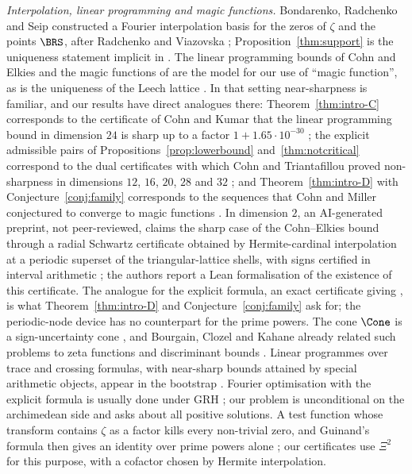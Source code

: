 \emph{Interpolation, linear programming and magic functions.} Bondarenko, Radchenko and Seip \cite{BRS} constructed a Fourier
interpolation basis for the zeros of $\zeta$ and the points $\BRS$, after Radchenko and Viazovska \cite{RV19}; Proposition~\ref{thm:support}
is the uniqueness statement implicit in \cite[\S4.4]{BRS}. The linear programming bounds of Cohn and Elkies \cite{CE03} and the magic
functions of \cite{Via17,CKMRV17,CKMRV22} are the model for our use of ``magic function'', as is the uniqueness of the Leech lattice
\cite{CK09}. In that setting near-sharpness is familiar, and our results have direct analogues there: Theorem~\ref{thm:intro-C} corresponds to
the certificate of Cohn and Kumar that the linear programming bound in dimension $24$ is sharp up to a factor $1+1.65\cdot10^{-30}$
\cite{CK09}; the explicit admissible pairs of Propositions~\ref{prop:lowerbound} and~\ref{thm:notcritical} correspond to the dual
certificates with which Cohn and Triantafillou proved non-sharpness in dimensions $12$, $16$, $20$, $28$ and $32$ \cite{CT22}; and Theorem~\ref{thm:intro-D} with
Conjecture~\ref{conj:family} corresponds to the sequences that Cohn and Miller conjectured to converge to magic functions \cite{CM16}. In dimension $2$, an AI-generated preprint, not
peer-reviewed, claims the sharp case of the Cohn--Elkies bound \cite[Conjecture~7.3]{CE03} through a radial Schwartz certificate obtained by
Hermite-cardinal interpolation at a periodic superset of the triangular-lattice shells, with signs certified in interval arithmetic
\cite{OAI26planar}; the authors report a Lean formalisation of the existence of this certificate. The analogue for the explicit formula, an
exact certificate giving \condS, is what Theorem~\ref{thm:intro-D} and Conjecture~\ref{conj:family} ask for; the periodic-node device has
no counterpart for the prime powers. The cone $\Cone$ is a sign-uncertainty cone \cite{BCK10,CG19,CIR24}, and Bourgain, Clozel and Kahane already related such
problems to zeta functions and discriminant bounds \cite[\S4]{BCK10}. Linear programmes over trace and crossing formulas, with near-sharp
bounds attained by special arithmetic objects, appear in the bootstrap \cite{HMR19,KMP24}. Fourier optimisation with the explicit formula
is usually done under GRH \cite{CMS19,CGdL}; our problem is unconditional on the archimedean side and asks about all positive solutions. A
test function whose transform contains $\zeta$ as a factor kills every non-trivial zero, and Guinand's formula then gives an identity over
prime powers alone \cite{RR22}; our certificates use $\Xi^2$ for this purpose, with a cofactor chosen by Hermite interpolation.

